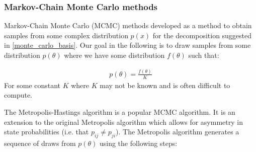 \documentclass[12pt]{article} %
\begin{document}

\subsubsection{Markov-Chain Monte Carlo methods}
Markov-Chain Monte Carlo (MCMC) methods developed as a method to obtain samples from some complex distribution $p(x)$ for the decomposition suggested in \eqref{monte_carlo_basis}. Our goal in the following is to draw samples from some distribution $p(\theta)$ where we have some distribution $f(\theta)$ such that:

\begin{align}
p(\theta) = \frac{f(\theta)}{K} 
\end{align}
For some constant $K$ where $K$ may not be known and is often difficult to compute.

The Metropolis-Hastings algorithm \cite{HastingsMonteCarloSampling} is a popular MCMC algorithm. It is an extension to the original Metropolis algorithm which allows for asymmetry in state probabilities (i.e. that $p_{ij} \neq p_{ji}$). The Metropolis algorithm \cite{MetropolisMonteCarloMethod1949} \cite{MetropolisEquationStateCalculations1953} generates a sequence of draws from $p(\theta)$ using the following steps:
\end{document}
